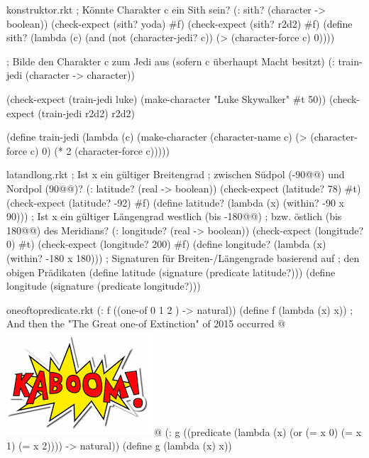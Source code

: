 \begin{filecontents*}{konstruktor.rkt}
; Könnte Charakter c ein Sith sein?
(: sith? (character -> boolean))
(check-expect (sith? yoda) #f)
(check-expect (sith? r2d2) #f)
(define sith?
  (lambda (c)
    (and (not (character-jedi? c))
         (> (character-force c) 0))))


; Bilde den Charakter c zum Jedi aus (sofern c überhaupt Macht besitzt)
(: train-jedi (character -> character))

(check-expect (train-jedi luke) (make-character "Luke Skywalker" #t 50))
(check-expect (train-jedi r2d2) r2d2)

(define train-jedi
  (lambda (c)
    (make-character (character-name c) 
                    (> (character-force c) 0)
                    (* 2 (character-force c)))))
\end{filecontents*}
\begin{filecontents*}{latandlong.rkt}
; Ist x ein gültiger Breitengrad 
; zwischen Südpol (-90@\latexcode{$^{\circ}$}@) und Nordpol (90@\latexcode{$^{\circ}$}@)?
(: latitude? (real -> boolean))
(check-expect (latitude? 78) #t)
(check-expect (latitude? -92) #f)
(define latitude?
  (lambda (x)
    (within? -90 x 90)))
; Ist x ein gültiger Längengrad westlich (bis -180@\latexcode{$^{\circ}$}@) 
; bzw. östlich (bis 180@\latexcode{$^{\circ}$}@) des Meridians?
(: longitude? (real -> boolean))
(check-expect (longitude? 0) #t)
(check-expect (longitude? 200) #f)
(define longitude?
  (lambda (x)
    (within? -180 x 180)))
; Signaturen für Breiten-/Längengrade basierend auf
; den obigen Prädikaten
(define latitude
  (signature (predicate latitude?)))
(define longitude
  (signature (predicate longitude?)))
\end{filecontents*}
\begin{filecontents*}{oneoftopredicate.rkt}
(: f ((one-of 0 1 2 ) -> natural))
(define f
  (lambda (x)
    x))
; And then the "The Great one-of Extinction" of 2015 occurred @\includegraphics[scale=0.5]{kaboon}@
(: g ((predicate 
       (lambda (x) (or (= x 0) (= x 1) (= x 2)))) -> natural))
(define g
  (lambda (x)
    x))
\end{filecontents*}
